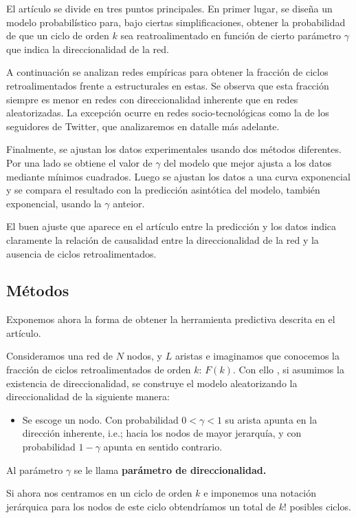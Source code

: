 \documentclass[1p]{elsarticle}
\begin{document}
    El artículo se divide en tres puntos principales.
    En primer lugar, se diseña un modelo probabilístico para, bajo ciertas simplificaciones, obtener la probabilidad de que un ciclo de orden $k$ sea reatroalimentado en función de cierto parámetro $\gamma$ que indica la direccionalidad de la red.

    A continuación se analizan redes empíricas para obtener la fracción de ciclos retroalimentados frente a estructurales en estas.
    Se observa que esta fracción siempre es menor en redes con direccionalidad inherente que en redes aleatorizadas. 
    La excepción ocurre en redes socio-tecnológicas como la de los seguidores de Twitter, que analizaremos en datalle más adelante.
 
    
    Finalmente, se ajustan los datos experimentales usando dos métodos diferentes.
    Por una lado se obtiene el valor de $\gamma$ del modelo que mejor ajusta a los datos mediante mínimos cuadrados.
    Luego se ajustan los datos a una curva exponencial y se compara el resultado con la predicción asintótica del modelo, también exponencial, usando la $\gamma$ anteior.

    El buen ajuste que aparece en el artículo entre la predicción y los datos indica claramente la relación de causalidad entre la direccionalidad de la red y la ausencia de ciclos retroalimentados.


\subsection{Métodos}
    Exponemos ahora la forma de obtener la herramienta predictiva descrita en el artículo.

    Consideramos una red de $N$ nodos, y $L$ aristas e imaginamos que conocemos la fracción de ciclos retroalimentados de orden $k$: $F(k)$. Con ello , si asumimos la existencia de direccionalidad, se construye el modelo aleatorizando la direccionalidad de la siguiente manera: 
\begin{itemize}
	\item Se escoge un nodo. Con probabilidad $0<\gamma<1$ su arista apunta en la dirección inherente, i.e.; hacia los nodos de mayor jerarquía, y con probabilidad $1-\gamma$ apunta en sentido contrario.
\end{itemize}
Al parámetro $\gamma$ se le llama \textbf{parámetro de direccionalidad.}

Si ahora nos centramos en un ciclo de orden $k$ e imponemos una notación jerárquica para los nodos de este ciclo obtendríamos un total de $k!$ posibles ciclos. 
\end{document}
